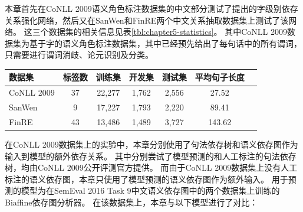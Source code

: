 本章首先在CoNLL 2009语义角色标注数据集的中文部分测试了提出的字级别依存关系强化网络，然后又在SanWen和FinRE两个中文关系抽取数据集上测试了该网络。
这三个数据集的相关信息见表\ref{tbl:chapter5-statistics}。
其中CoNLL 2009数据集为基于字的语义角色标注数据集，其中已经预先给出了每句话中的所有谓词，只需要进行谓词消歧、论元识别及分类。

\begin{table}[htbp]
    \vspace{0.5em}\centering\wuhao
    \begin{tabular}{lcccccc}
        \toprule[1.5pt]
        数据集 & 标签数 & 训练集 & 开发集 & 测试集 & 平均句子长度 \\
        \midrule[1pt]
        CoNLL 2009 & 37 & 22,277 & 1,762 & 2,556 & 27.52 \\
        SanWen     & 9  & 17,227 & 1,793 & 2,220 & 89.41 \\
        FinRE      & 43 & 13,486 & 1,489 & 3,727 & 143.62 \\
        \bottomrule[1.5pt]
    \end{tabular}
\end{table}

在CoNLL 2009数据集上的实验中，本章分别使用了句法依存树和语义依存图作为输入到模型的额外依存关系。
其中分别尝试了模型预测的和人工标注的句法依存树，均由CoNLL 2009公开评测官方提供。
而由于CoNLL 2009数据集上没有人工标注的语义依存图，本章只使用了模型预测的语义依存图作为额外输入。
用于预测的模型为在SemEval 2016 Task 9中文语义依存图中的两个数据集上训练的Biaffine依存图分析器。
在该数据集上，本章与以下模型进行了对比：

